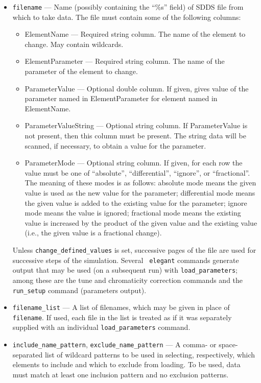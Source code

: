 \documentclass[11pt]{article}
\begin{document}
\begin{itemize}
\item \verb|filename| --- Name (possibly containing the ``\%s'' field) 
of SDDS file from which to take data.  The file
must contain some of the following columns:
\begin{itemize}
\item ElementName --- Required string column.  The name of the element to change. May contain wildcards.
\item ElementParameter --- Required string column.  The name of the parameter of the element to change.
\item ParameterValue --- Optional double column.  If given, gives value of the parameter named
 in ElementParameter for element named in ElementName.
\item ParameterValueString --- Optional string column.  If ParameterValue is not present, then
this column must be present.  The string data will be scanned, if necessary,
to obtain a value for the parameter.
\item ParameterMode --- Optional string column.  If given, for each row the value must be
one of ``absolute'', ``differential'', ``ignore'', or ``fractional''.  The meaning of these
modes is as follows: absolute mode means the given value is used as the new value for
the parameter; differential mode means the given value is added to the existing value
for the parameter; ignore mode means the value is ignored; fractional mode means the
existing value is increased by the product of the given value and the existing value 
(i.e., the given value is a fractional change).
\end{itemize}

Unless \verb|change_defined_values| is set, successive pages of the
file are used for successive steps of the simulation.  Several {\tt
elegant} commands generate output that may be used (on a subsequent
run) with \verb|load_parameters|; among these are the tune and
chromaticity correction commands and the \verb|run_setup| command
(parameters output).

\item \verb|filename_list| --- A list of filenames, which may be 
        given in place of \verb|filename|.  If used, each file
        in the list is treated as if it was separately supplied
        with an individual \verb|load_parameters| command.

\item \verb|include_name_pattern|, \verb|exclude_name_pattern| ---
A comma- or space-separated list of wildcard patterns to be used in selecting, respectively, which
elements to include and which to exclude from loading. 
To be used, data must match at least one inclusion pattern and no exclusion patterns.


\end{itemize}
\end{document}
